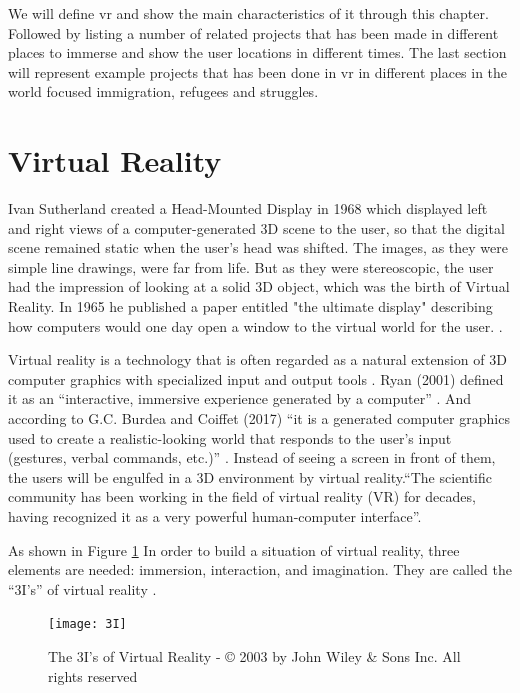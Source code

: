 We will define \acrfull{vr} and show the main characteristics of it through this chapter. Followed by listing a number of related projects that has been made in different places to immerse and show the user locations in different times. The last section will represent example projects that has been done in \acrshort{vr} in different places in the world focused immigration, refugees and struggles.   

\section{Virtual Reality}
Ivan Sutherland created a Head-Mounted Display in 1968 which displayed left and right views of a computer-generated 3D scene to the user, so that the digital scene remained static when the user's head was shifted. The images, as they were simple line drawings, were far from life. But as they were stereoscopic, the user had the impression of looking at a solid 3D object, which was the birth of Virtual Reality. In 1965 he published a paper entitled "the ultimate display" describing how computers would one day open a window to the virtual world for the user. \citep{Vince2011}.  

Virtual reality is a technology that is often regarded as a natural extension of 3D computer graphics with specialized input and output tools \citep{Jayaram1997}. Ryan (2001) defined it as an “interactive, immersive experience generated by a computer” \citep{Ryan2001}. And according to G.C. Burdea and Coiffet (2017) “it is a generated computer graphics used to create a realistic-looking world that responds to the user’s input (gestures, verbal commands, etc.)” \cite[p.20]{burdea2017virtual}. Instead of seeing a screen in front of them, the users will be engulfed in a 3D environment by virtual reality.“The scientific community has been working in the field of virtual reality (VR) for decades, having recognized it as a very powerful human-computer interface”\cite[p.19]{burdea2017virtual}. 

As shown in Figure \ref{fig:3I} In order to build a situation of virtual reality, three elements are needed:  immersion, interaction, and imagination. They are called the “3I’s” of virtual reality \citep{Hu2016,burdea2017virtual,Bamodu2013VirtualComponents}.

\begin{figure} %
    \centering
    \texttt{[image: 3I]}
    \caption{The 3I's of Virtual Reality - © 2003 by John Wiley \& Sons Inc. All rights
reserved}
    \label{fig:3I}
\end{figure}



